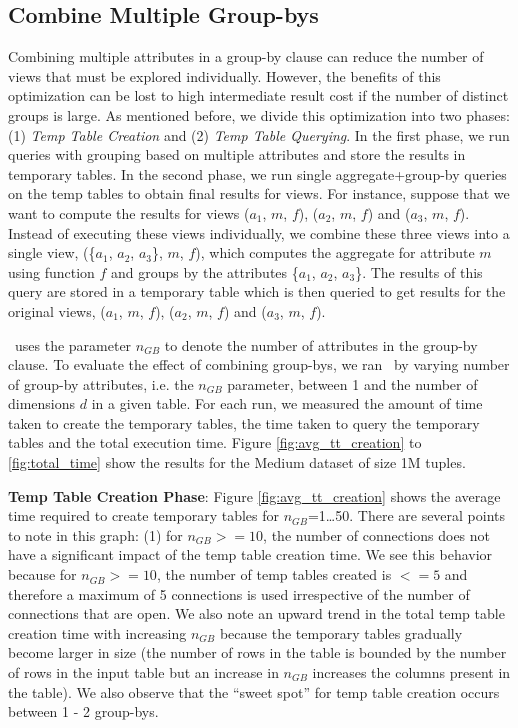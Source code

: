 \subsection {Combine Multiple Group-bys}
\label{subsec:mult_gb_expt}
Combining multiple attributes in a group-by clause can reduce the number of
views that must be explored individually.
However, the benefits of this optimization can be lost to high intermediate
result cost if the number of distinct groups is large. As mentioned before, we
divide this optimization into two phases:
(1) {\it Temp Table Creation} and (2) {\it Temp Table Querying}. In the first
phase, we run queries with grouping based on multiple attributes and store the
results in temporary tables. In the second phase, we run single
aggregate+group-by queries on the temp tables to obtain final results for views.
For instance, suppose that we want to compute the results for views ($a_1$, $m$,
$f$), ($a_2$, $m$, $f$) and ($a_3$, $m$, $f$). Instead of executing these views
individually, we combine these three views into a single view, (\{$a_1$, $a_2$,
$a_3$\}, $m$, $f$), which computes the aggregate for attribute $m$ using
function $f$ and groups by the attributes \{$a_1$, $a_2$, $a_3$\}. The results
of this query are stored in a temporary table which is then queried to get
results for the original views, ($a_1$, $m$, $f$), ($a_2$, $m$, $f$) and ($a_3$,
$m$, $f$).

\SeeDB\ uses the parameter $n_{GB}$ to denote the number of attributes in the
group-by clause. To evaluate the effect of combining group-bys, we ran \SeeDB\
by varying number of group-by attributes, i.e. the $n_{GB}$ parameter, between 1
and the number of dimensions $d$ in a given table. For each run, we measured the
amount of time taken to create the temporary tables, the time taken to query the
temporary tables and the total execution time. Figure
\ref{fig:avg_tt_creation} to \ref{fig:total_time} show the
results for the Medium dataset of size 1M tuples.

{\bf Temp Table Creation Phase}: Figure \ref{fig:avg_tt_creation} shows the
average time required to create temporary tables for $n_{GB}$=1\ldots50. There
are several points to note in this graph: (1) for $n_{GB}>=10$, the number of
connections does not have a significant impact of the temp table creation time.
We see this behavior because for $n_{GB}>=10$, the number of temp tables created
is $<=5$ and therefore a maximum of 5 connections is used irrespective of the
number of connections that are open.
We also note an upward trend in the total temp table creation time with
increasing $n_{GB}$ because the temporary tables gradually become larger in size
(the number of rows in the table is bounded by the number of rows in the input
table but an increase in $n_{GB}$ increases the columns present in the table).
We also observe that the ``sweet spot'' for temp table creation occurs between 1 -
2 group-bys. 

